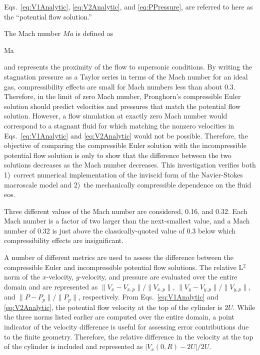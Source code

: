 \noindent Eqs.\ \eqref{eq:V1Analytic}, \eqref{eq:V2Analytic}, and \eqref{eq:PPressure}, are referred to here as the ``potential flow solution.''

The Mach number \(Ma\) is defined as

\beq
\label{eq:MaDef}
Ma\equiv{}\ 
\eeq

\noindent and represents the proximity of the flow to supersonic conditions. By writing the stagnation pressure as a Taylor series in terms of the Mach number for an ideal gas, compressibility effects are small for Mach numbers less than about 0.3. Therefore, in the limit of zero Mach number, Pronghorn's compressible Euler solution should predict velocities and pressures that match the potential flow solution. However, a flow simulation at exactly zero Mach number would correspond to a stagnant fluid for which matching the nonzero velocities in Eqs.\ \eqref{eq:V1Analytic} and \eqref{eq:V2Analytic} would not be possible. Therefore, the objective of comparing the compressible Euler solution with the incompressible potential flow solution is only to show that the difference between the two solutions decreases as the Mach number decreases. This investigation verifies both 1)~correct numerical implementation of the inviscid form of the Navier-Stokes macroscale model and 2)~the mechanically compressible dependence on the fluid \gls{eos}.

Three different values of the Mach number are considered, 0.16, and 0.32. Each Mach number is a factor of two larger than the next-smallest value, and a Mach number of 0.32 is just above the classically-quoted value of 0.3 below which compressibility effects are insignificant.

A number of different metrics are used to assess the difference between the compressible Euler and incompressible potential flow solutions. The relative L$^2$ norm of the $x$-velocity, $y$-velocity, and pressure are evaluated over the entire domain and are represented as \mbox{\(\|V_x-V_{x,p}\|/\|V_{x,p}\|\)}, \(\|V_y-V_{y,p}\|/\|V_{y,p}\|\), and \(\|P-P_p\|/\|P_p\|\), respectively. From Eqs.\ \eqref{eq:V1Analytic} and \eqref{eq:V2Analytic}, the potential flow velocity at the top of the cylinder is \(2U\). While the three norms listed earlier are computed over the entire domain, a point indicator of the velocity difference is useful for assessing error contributions due to the finite geometry. Therefore, the relative difference in the velocity at the top of the cylinder is included and represented as \(|V_x(0, R)-2U|/2U\).

